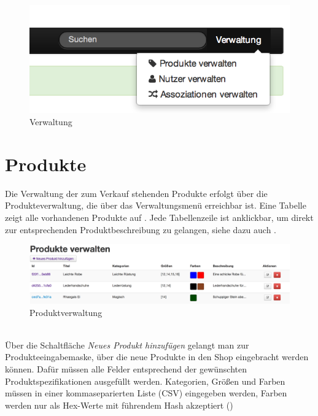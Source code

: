\begin{figure}[h!]
  \centering
  \includegraphics[scale=1]{img/Verwaltung.png}
  \caption{Verwaltung}
  \label{fig:Verwaltung}
\end{figure}


\section{Produkte}
\label{chp:Produkte}
Die Verwaltung der zum Verkauf stehenden Produkte erfolgt über die Produkteverwaltung, die über das Verwaltungsmenü erreichbar ist. Eine Tabelle zeigt alle vorhandenen Produkte auf . Jede Tabellenzeile ist anklickbar, um direkt zur entsprechenden Produktbeschreibung zu gelangen, siehe dazu auch .

\begin{figure}[h!]
  \centering
  \includegraphics[width=\textwidth]{img/Produkte.png}
  \caption{Produktverwaltung}
  \label{fig:Produktverwaltung}
\end{figure}
\text{}\vspace*{-1em}\\
Über die Schaltfläche \textit{Neues Produkt hinzufügen} gelangt man zur Produkteeingabemaske, über die neue Produkte in den Shop eingebracht werden können. Dafür müssen alle Felder entsprechend der gewünschten Produktspezifikationen ausgefüllt werden. Kategorien, Größen und Farben müssen in einer kommaseparierten Liste (CSV) eingegeben werden, Farben werden nur als Hex-Werte mit führendem Hash akzeptiert ()

